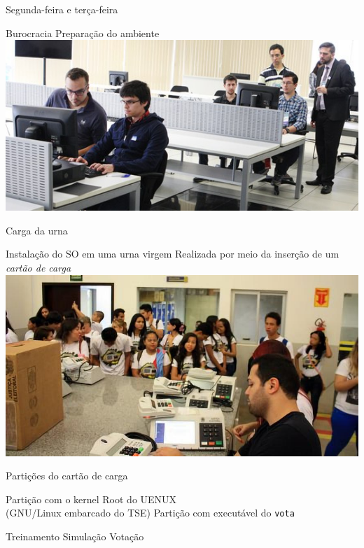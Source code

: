 \documentclass[14pt]{beamer}
\begin{document}
\begin{frame}{Segunda-feira e terça-feira}
  \begin{fullpageitemize}
    \itemR Burocracia
    \itemR Preparação do ambiente
    \vfill
    {\centering
    \includegraphics[width=\textwidth,height=0.90\textheight,keepaspectratio]{images/prep_ambiente}}
  \end{fullpageitemize}
\end{frame}

\begin{frame}{Carga da urna}
  \begin{fullpageitemize}
    \itemR Instalação do SO em uma urna virgem
    \itemR Realizada por meio da inserção de um \textit{cartão de carga}
    \vfill
    {\centering
    \includegraphics[width=\textwidth,height=0.90\textheight,keepaspectratio]{images/criancas_carga}}
  \end{fullpageitemize}
\end{frame}

\begin{frame}{Partições do cartão de carga}
  \begin{fullpageitemize}
    \itemR Partição com o kernel
    \itemR Root do UENUX\\(GNU/Linux embarcado do TSE)
    \itemR Partição com executável do \texttt{vota}
      \begin{itemize}
        \itemR Treinamento
        \itemR Simulação
        \itemR Votação
      \end{itemize}
  \end{fullpageitemize}
\end{frame}
\end{document}
